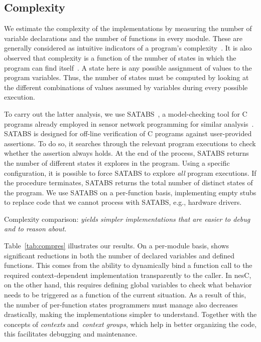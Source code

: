\subsection{Complexity}\label{sec:complexity}

We estimate the complexity of the implementations by measuring the
number of variable declarations and the number of functions in every
module. These are generally considered as intuitive indicators of a
program's complexity~\cite{pressman01}. It is also observed that
complexity is a function of the number of states in which the program
can find itself~\cite{35}. A state here is any possible assignment of
values to the program variables. Thus, the number of states must be
computed by looking at the different combinations of values assumed by
variables during every possible execution.

To carry out the latter analysis, we use SATABS~\cite{satabs}, a
model-checking tool for C programs already employed in sensor network
programming for similar analysis~\cite{mottola11survey}. SATABS is
designed for off-line verification of C programs against user-provided
assertions. To do so, it searches through the relevant program
executions to check whether the assertion always holds. At the end of
the process, SATABS returns the number of different states it explores
in the program.  Using a specific configuration, it is possible to
force SATABS to explore \emph{all} program executions. If the
procedure terminates, SATABS returns the total number of distinct
states of the program. We use SATABS on a per-function basis,
implementing empty stubs to replace code that we cannot process with
SATABS, e.g., hardware drivers.

\begin{table}[!tb]
\renewcommand{\arraystretch}{1.3}
\caption{Complexity comparison: \emph{\conesc yields simpler implementations that are easier to debug and to reason about.}}
\label{tab:compres}

\end{table}

 Table~\ref{tab:compres} illustrates our
results. On a per-module basis, \conesc shows significant reductions
in both the number of declared variables and defined functions. This
comes from the ability to dynamically bind a function call to the
required context-dependent implementation transparently to the
caller. In nesC, on the other hand, this requires defining global
variables to check what behavior needs to be triggered as a function
of the current situation. As a result of this, the number of
per-function states programmers must manage also decreases
drastically, making the implementations simpler to
understand. Together with the concepts of \emph{contexts}
and~\emph{context groups}, which help in better organizing the code,
this facilitates debugging and maintenance.

